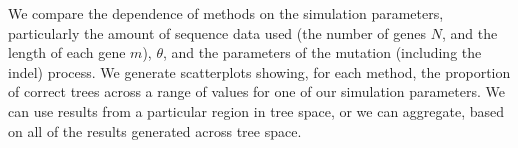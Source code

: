 \documentclass[12pt]{article}
\theoremstyle{definition}
\begin{document}
We compare the dependence of methods on the simulation parameters, particularly the amount of sequence data used (the number of genes $N$, and the length of each gene $m$), $\theta$, and the parameters of the mutation (including the indel) process. 
We generate scatterplots showing, for each method, the proportion of correct trees across a range of values for one of our simulation parameters.
We can use results from a particular region in tree space, or we can aggregate, based on all of the results generated across tree space.
















  

    
    
    
    
    
\end{document}
